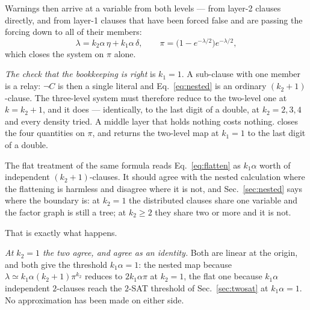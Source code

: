 Warnings then arrive at a variable from both levels --- from layer-2 clauses
directly, and from layer-1 clauses that have been forced false and are passing
the forcing down to all of their members:
\begin{equation}
  \lambda=k_{2}\alpha\,\eta+k_{1}\alpha\,\delta,
  \qquad
  \pi=\bigl(1-e^{-\lambda/2}\bigr)e^{-\lambda/2},
  \label{eq:nestedwp}
\end{equation}
which closes the system on $\pi$ alone.

\emph{The check that the bookkeeping is right} is $k_{1}=1$. A sub-clause with
one member is a relay: $\neg C$ is then a single literal and
Eq.~\eqref{eq:nested} is an ordinary $(k_{2}+1)$-clause. The three-level system
must therefore reduce to the two-level one at $k=k_{2}+1$, and it does ---
identically, to the last digit of a double, at $k_{2}=2,3,4$ and every density
tried. A middle layer that holds nothing costs nothing.  closes the four quantities on $\pi$, and returns the two-level map at $k_{1}=1$ to the last digit of a double.

The flat treatment of the same formula reads
Eq.~\eqref{eq:flatten} as $k_{1}\alpha$ worth of independent
$(k_{2}+1)$-clauses. It should agree with the nested calculation where the
flattening is harmless and disagree where it is not, and
Sec.~\ref{sec:nested} says where the boundary is: at $k_{2}=1$ the distributed
clauses share one variable and the factor graph is still a tree; at $k_{2}\ge2$
they share two or more and it is not.

That is exactly what happens.

\emph{At $k_{2}=1$ the two agree, and agree as an identity.} Both are linear at
the origin, and both give the threshold $k_{1}\alpha=1$: the nested map because
$\lambda\simeq k_{1}\alpha(k_{2}+1)\pi^{k_{2}}$ reduces to $2k_{1}\alpha\pi$ at
$k_{2}=1$, the flat one because $k_{1}\alpha$ independent $2$-clauses reach the
$2$-SAT threshold of Sec.~\ref{sec:twosat} at $k_{1}\alpha=1$. No approximation
has been made on either side.

